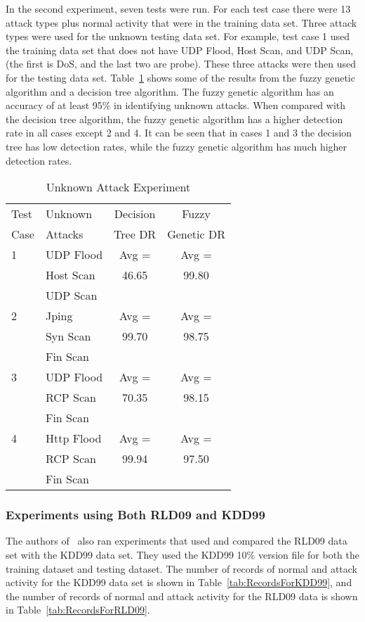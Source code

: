 \documentclass{sig-alternate}
\begin{document}
In the second experiment, seven tests were run. For each test case there were 13 attack types plus normal activity that were in the training data set. Three attack types were used for the unknown testing data set. For example, test case 1 used the training data set that does not have UDP Flood, Host Scan, and UDP Scan, (the first is DoS, and the last two are probe). These three attacks were then used for the testing data set. Table~\ref{tab:fuzGenExp2} shows some of the results from the fuzzy genetic algorithm and a decision tree algorithm. The fuzzy genetic algorithm has an accuracy of at least 95\% in identifying unknown attacks. When compared with the decision tree algorithm, the fuzzy genetic algorithm has a higher detection rate in all cases except 2 and 4. It can be seen that in cases 1 and 3 the decision tree has low detection rates, while the fuzzy genetic algorithm has much higher detection rates.


\begin{table}
\caption{Unknown Attack Experiment}
\begin{tabular}{|llcc|} \hline
Test & Unknown & Decision & Fuzzy\\
Case & Attacks & Tree DR  & Genetic DR\\ \hline

1 & UDP Flood & Avg = & Avg =\\
  & Host Scan & 46.65 & 99.80\\
  & UDP Scan  &       &\\ \hline

2 & Jping    & Avg =          & Avg =\\
  & Syn Scan & 99.70 & 98.75\\
  & Fin Scan &                &\\ \hline

3 & UDP Flood & Avg = & Avg =\\
  & RCP Scan  & 70.35 & 98.15\\
  & Fin Scan  &       &\\ \hline

4 & Http Flood & Avg =          & Avg =\\
  & RCP Scan  & 99.94 & 97.50\\
  & Fin Scan  &                &\\
\hline\end{tabular}
\label{tab:fuzGenExp2}
\end{table}




\subsubsection{Experiments using Both RLD09 and KDD99}
The authors of~\cite{6496342, 6559603} also ran experiments that used and compared the RLD09 data set with the KDD99 data set. They used the KDD99 10\% version file for both the training dataset and testing dataset. The number of records of normal and attack activity for the KDD99 data set is shown in Table~\ref{tab:RecordsForKDD99}, and the number of records of normal and attack activity for the RLD09 data is shown in Table~\ref{tab:RecordsForRLD09}.
\end{document}
